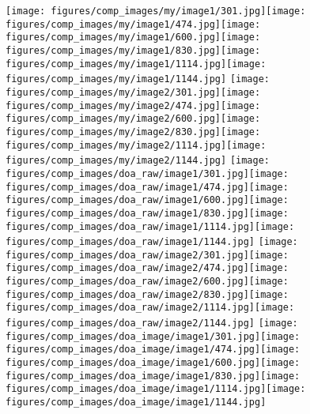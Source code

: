 \documentclass[10pt,twocolumn,letterpaper]{article}
\begin{document}
\begin{figure*}[tb]
\centering
\texttt{[image: figures/comp\_images/my/image1/301.jpg]}\texttt{[image: figures/comp\_images/my/image1/474.jpg]}\texttt{[image: figures/comp\_images/my/image1/600.jpg]}\texttt{[image: figures/comp\_images/my/image1/830.jpg]}\texttt{[image: figures/comp\_images/my/image1/1114.jpg]}\texttt{[image: figures/comp\_images/my/image1/1144.jpg]}\linebreak
\texttt{[image: figures/comp\_images/my/image2/301.jpg]}\texttt{[image: figures/comp\_images/my/image2/474.jpg]}\texttt{[image: figures/comp\_images/my/image2/600.jpg]}\texttt{[image: figures/comp\_images/my/image2/830.jpg]}\texttt{[image: figures/comp\_images/my/image2/1114.jpg]}\texttt{[image: figures/comp\_images/my/image2/1144.jpg]}\linebreak
\texttt{[image: figures/comp\_images/doa\_raw/image1/301.jpg]}\texttt{[image: figures/comp\_images/doa\_raw/image1/474.jpg]}\texttt{[image: figures/comp\_images/doa\_raw/image1/600.jpg]}\texttt{[image: figures/comp\_images/doa\_raw/image1/830.jpg]}\texttt{[image: figures/comp\_images/doa\_raw/image1/1114.jpg]}\texttt{[image: figures/comp\_images/doa\_raw/image1/1144.jpg]}\linebreak
\texttt{[image: figures/comp\_images/doa\_raw/image2/301.jpg]}\texttt{[image: figures/comp\_images/doa\_raw/image2/474.jpg]}\texttt{[image: figures/comp\_images/doa\_raw/image2/600.jpg]}\texttt{[image: figures/comp\_images/doa\_raw/image2/830.jpg]}\texttt{[image: figures/comp\_images/doa\_raw/image2/1114.jpg]}\texttt{[image: figures/comp\_images/doa\_raw/image2/1144.jpg]}\linebreak
\texttt{[image: figures/comp\_images/doa\_image/image1/301.jpg]}\texttt{[image: figures/comp\_images/doa\_image/image1/474.jpg]}\texttt{[image: figures/comp\_images/doa\_image/image1/600.jpg]}\texttt{[image: figures/comp\_images/doa\_image/image1/830.jpg]}\texttt{[image: figures/comp\_images/doa\_image/image1/1114.jpg]}\texttt{[image: figures/comp\_images/doa\_image/image1/1144.jpg]}\linebreak

\end{figure*}
\end{document}

